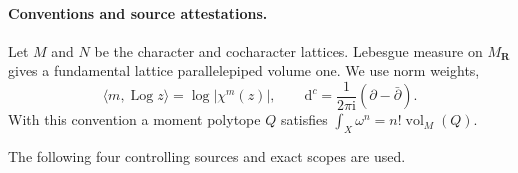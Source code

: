 
\paragraph{Conventions and source attestations.}
Let \(M\) and \(N\) be the character and cocharacter lattices.  Lebesgue
measure on \(M_{\mathbf R}\) gives a fundamental lattice parallelepiped
volume one.  We use norm weights,
\[
 \langle m,\operatorname{Log}z\rangle=\log|\chi^m(z)|,
 \qquad
 \mathrm d^c=\frac{1}{2\pi\mathrm i}(\partial-\bar\partial).
\]
With this convention a moment polytope \(Q\) satisfies
\(\int_X\omega^n=n!\operatorname{vol}_M(Q)\).

The following four controlling sources and exact scopes are used.

